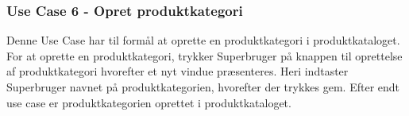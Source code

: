 \subsubsection{Use Case 6 - Opret produktkategori}
Denne Use Case har til formål at oprette en produktkategori i produktkataloget. For at oprette en produktkategori, trykker Superbruger på knappen til oprettelse af produktkategori hvorefter et nyt vindue præsenteres. Heri indtaster Superbruger navnet på produktkategorien, hvorefter der trykkes gem. Efter endt use case er produktkategorien oprettet i produktkataloget.